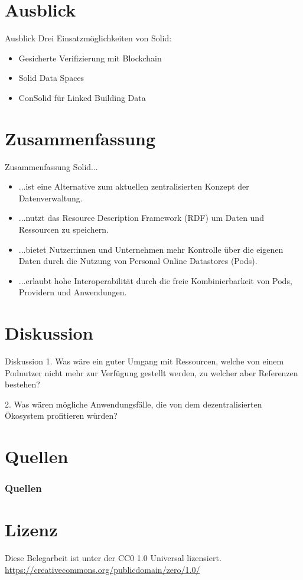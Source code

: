 \documentclass{beamer}              %
\begin{document}
\section{Ausblick}
\begin{frame}{Ausblick}
Drei Einsatzmöglichkeiten von Solid:
\begin{itemize}
    \item Gesicherte Verifizierung mit Blockchain ~\cite{ramachandran2020towards}
    \item Solid Data Spaces ~\cite{meckler2023web}
    \item ConSolid für Linked Building Data ~\cite{8633673}~\cite{werbrouck2022consolid}
\end{itemize}
\end{frame}

\section{Zusammenfassung}
\begin{frame}{Zusammenfassung}
Solid...
\begin{itemize}
    \item ...ist eine Alternative zum aktuellen zentralisierten Konzept der Datenverwaltung.
    \item ...nutzt das Resource Description Framework (RDF) um Daten und Ressourcen zu speichern.
    \item ...bietet Nutzer:innen und Unternehmen mehr Kontrolle über die eigenen Daten durch die Nutzung von Personal Online Datastores (Pods).
    \item ...erlaubt hohe Interoperabilität durch die freie Kombinierbarkeit von Pods, Providern und Anwendungen.
\end{itemize}
\end{frame}

\section{Diskussion}
\begin{frame}{Diskussion}
1. Was wäre ein guter Umgang mit Ressourcen, welche von einem Podnutzer nicht mehr zur Verfügung gestellt werden, zu welcher aber Referenzen bestehen?


2. Was wären mögliche Anwendungsfälle, die von dem dezentralisierten Ökosystem profitieren würden?
\end{frame}

\section{Quellen}
\begin{frame}[allowframebreaks]
        \frametitle{Quellen}
        
        
\end{frame}

\section{Lizenz}
\begin{frame}{}
   \centering Diese Belegarbeit ist unter der CC0 1.0 Universal lizensiert. \url{https://creativecommons.org/publicdomain/zero/1.0/}
\end{frame}
\end{document}
